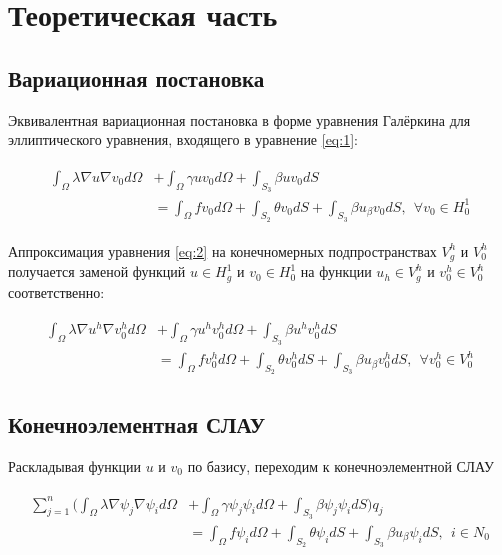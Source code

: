 \documentclass[12pt]{article}
\begin{document}
\section{Теоретическая часть}

\subsection{Вариационная постановка}

\noindent Эквивалентная вариационная постановка в форме уравнения Галёркина для
эллиптического уравнения, входящего в уравнение \ref{eq:1}:

\begin{align} \label{eq:2}
  \begin{split}
    \int_{\Omega}\lambda \nabla u \nabla v_0 d\Omega &+
    \int_{\Omega}\gamma uv_0 d\Omega +
    \int_{S_3}\beta uv_0 dS \\
    &= \int_{\Omega}f v_0 d\Omega +
    \int_{S_2}\theta v_0 dS +
    \int_{S_3}\beta u_{\beta} v_0 dS, \ \ \forall v_0 \in H_0^1
  \end{split}
\end{align}

\vskip 5mm
\noindent Аппроксимация уравнения \ref{eq:2} на конечномерных подпространствах $V^h_g$ и $V^h_0$ 
получается заменой функций $u \in H^1_g$ и $v_0 \in H^1_0$ на 
функции $u_h \in V^h_g$ и $v^h_0 \in V^h_0$ соответственно:

\begin{align}
  \begin{split}
    \int_{\Omega}\lambda \nabla u^h \nabla v^h_0 d\Omega &+
    \int_{\Omega}\gamma u^h v^h_0 d\Omega +
    \int_{S_3}\beta u^h v^h_0 dS \\
    &= \int_{\Omega}f v^h_0 d\Omega +
    \int_{S_2}\theta v^h_0 dS +
    \int_{S_3}\beta u_{\beta} v^h_0 dS, \ \ \forall v^h_0 \in V^h_0
  \end{split}
\end{align}

\vskip 5mm

\subsection{Конечноэлементная СЛАУ}

\noindent Раскладывая функции $u$ и $v_0$ по базису, переходим к конечноэлементной СЛАУ

\begin{align}
  \begin{split}
    \sum_{j=1}^{n}\big(
      \int_{\Omega}\lambda \nabla \psi_j \nabla \psi_i d\Omega &+
      \int_{\Omega}\gamma \psi_j \psi_i d\Omega +
      \int_{S_3}\beta \psi_j \psi_i dS
    \big)q_j \\
    &= \int_{\Omega}f \psi_i d\Omega +
    \int_{S_2}\theta \psi_i dS +
    \int_{S_3}\beta u_{\beta} \psi_i dS, \ \ i \in N_0
  \end{split}
\end{align}
\end{document}
